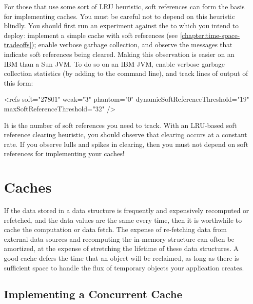 For those \jres that use some sort of LRU heuristic, soft references can form the
basis for implementing caches. You must be careful not to depend on this
heuristic blindly. You should first run an experiment against the \jre to which
you intend to deploy: implement a simple cache with soft references (see
\autoref{chapter:time-space-tradeoffs}); enable verbose garbage collection, and
observe the messages that indicate soft references being cleared. Making this
observation is easier on an IBM than a Sun JVM. To do so on an IBM JVM, enable
verbose garbage collection statistics (by adding  to the
command line), and track lines of output of this form:
\begin{shortlisting}
<refs soft="27801" weak="3" phantom="0" dynamicSoftReferenceThreshold="19" maxSoftReferenceThreshold="32" />
\end{shortlisting}
It is the number of soft references you need to track. With an
LRU-based soft reference clearing heuristic, you should observe that clearing
occurs at a constant rate. If you observe lulls and spikes in clearing, then you
must not depend on soft references for implementing your caches!




\section{Caches}

If the data stored in a data structure is frequently and expensively recomputed
or refetched, and the data values are the same every time, then it is worthwhile
to cache the computation or data fetch. The expense of re-fetching data from
external data sources and recomputing the in-memory structure can often be
amortized, at the expense of stretching the lifetime of these data structures. A
good cache defers the time that an object will be reclaimed, as long as there is
sufficient space to handle the flux of temporary objects your application
creates.

\subsection{Implementing a Concurrent Cache}
\label{sec:lifetime-management-concurrency-issues}

